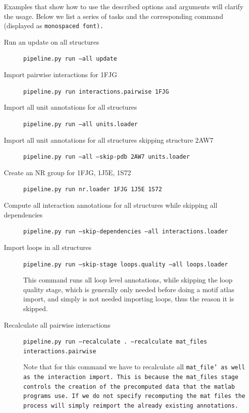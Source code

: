 Examples that show how to use the described options and arguments will clarify
the usage. Below we list a series of tasks and the corresponding command
(displayed as \tt{monospaced font}).

\begin{description}
        \item [Run an update on all structures]
                \tt{pipeline.py run --all update}

        \item [Import pairwise interactions for 1FJG]
                \tt{pipeline.py run interactions.pairwise 1FJG}

        \item [Import all unit annotations for all structures]
                \tt{pipeline.py run --all units.loader}

        \item [Import all unit annotations for all structures skipping structure 2AW7]
                \tt{pipeline.py run --all --skip-pdb 2AW7 units.loader}

        \item [Create an NR group for 1FJG, 1J5E, 1S72]
                \tt{pipeline.py run nr.loader 1FJG 1J5E 1S72}

        \item [Compute all interaction annotations for all structures while skipping all dependencies]
                \tt{pipeline.py run --skip-dependencies --all interactions.loader}

        \item [Import loops in all structures]
                \tt{pipeline.py run --skip-stage loops.quality --all loops.loader}

                This command runs all loop level annotations, while skipping the loop quality stage,
                which is generally only needed before doing a motif atlas import, and simply is not
                needed importing loops, thus the reason it is skipped.

        \item [Recalculate all pairwise interactions]
                \tt{pipeline.py run --recalculate . --recalculate mat\_files interactions.pairwise}

                Note that for this command we have to recalculate all
                \tt{mat\_file}' as well as the interaction import. This is
                because the \tt{mat\_files} stage controls the creation of the
                precomputed data that the matlab programs use. If we do not
                specify recomputing the mat files the process will simply
                reimport the already existing annotations.



\end{description}
